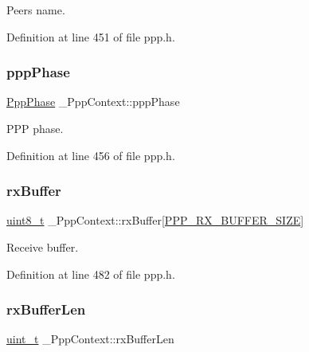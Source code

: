 Peer\textquotesingle{}s name. 



Definition at line 451 of file ppp.\+h.

\mbox{\label{struct__PppContext_af9fee6f7b455627524fd0c12d2670c07}} 
\subsubsection{\texorpdfstring{ppp\+Phase}{pppPhase}}
{\footnotesize\ttfamily \hyperlink{ppp_8h_aa187b5eb62890e0b7bac9a94259c1d29}{Ppp\+Phase} \+\_\+\+Ppp\+Context\+::ppp\+Phase}



P\+PP phase. 



Definition at line 456 of file ppp.\+h.

\mbox{\label{struct__PppContext_af7570652d9bf2726a57132474f4015d3}} 
\subsubsection{\texorpdfstring{rx\+Buffer}{rxBuffer}}
{\footnotesize\ttfamily \hyperlink{stdint_8h_aba7bc1797add20fe3efdf37ced1182c5}{uint8\+\_\+t} \+\_\+\+Ppp\+Context\+::rx\+Buffer\mbox{[}\hyperlink{ppp_8h_a0be94e0f451395fe16c2597482786de3}{P\+P\+P\+\_\+\+R\+X\+\_\+\+B\+U\+F\+F\+E\+R\+\_\+\+S\+I\+ZE}\mbox{]}}



Receive buffer. 



Definition at line 482 of file ppp.\+h.

\mbox{\label{struct__PppContext_a24667af05f0d2c763b576c09bdc7d4e2}} 
\subsubsection{\texorpdfstring{rx\+Buffer\+Len}{rxBufferLen}}
{\footnotesize\ttfamily \hyperlink{compiler__port_8h_a12a1e9b3ce141648783a82445d02b58d}{uint\+\_\+t} \+\_\+\+Ppp\+Context\+::rx\+Buffer\+Len}



